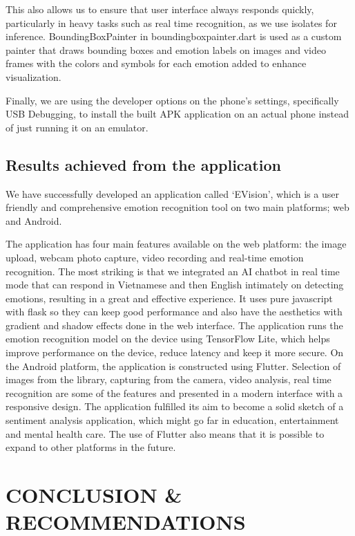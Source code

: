 \documentclass[a4paper,13pt]{report}
\begin{document}
This also allows us to ensure that user interface always responds quickly, particularly in heavy tasks such as real time recognition, as we use isolates for inference. BoundingBoxPainter in bounding\textunderscore box\textunderscore painter.dart is used as a custom painter that draws bounding boxes and emotion labels on images and video frames with the colors and symbols for each emotion added to enhance visualization.

Finally, we are using the developer options on the phone’s settings, specifically USB Debugging, to install the built APK application on an actual phone instead of just running it on an emulator.

\section{Results achieved from the application}
We have successfully developed an application called ‘EVision’, which is a user friendly and comprehensive emotion recognition tool on two main platforms; web and Android.

The application has four main features available on the web platform: the image upload, webcam photo capture, video recording and real-time emotion recognition. The most striking is that we integrated an AI chatbot in real time mode that can respond in Vietnamese and then English intimately on detecting emotions, resulting in a great and effective experience. It uses pure javascript with flask so they can keep good performance and also have the aesthetics with gradient and shadow effects done in the web interface.
The application runs the emotion recognition model on the device using TensorFlow Lite, which helps improve performance on the device, reduce latency and keep it more secure. On the Android platform, the application is constructed using Flutter. Selection of images from the library, capturing from the camera, video analysis, real time recognition are some of the features and presented in a modern interface with a responsive design.
The application fulfilled its aim to become a solid sketch of a sentiment analysis application, which might go far in education, entertainment and mental health care. The use of Flutter also means that it is possible to expand to other platforms in the future.


\clearpage
\chapter{CONCLUSION \& RECOMMENDATIONS}
\end{document}
